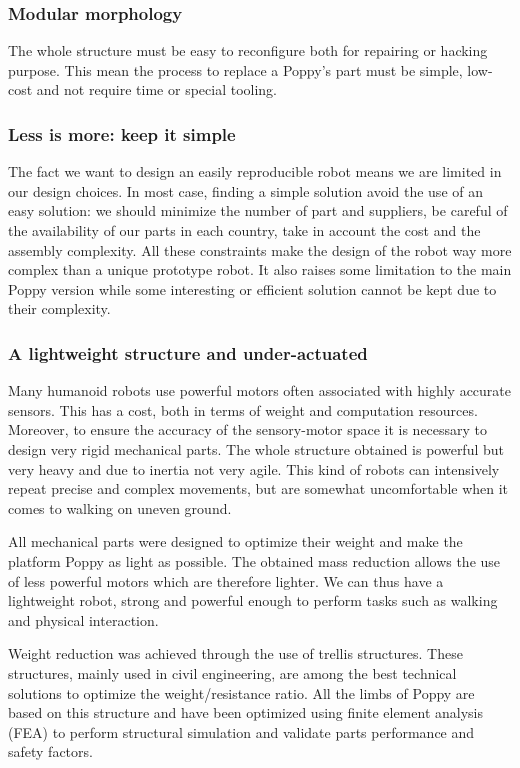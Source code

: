 \subsubsection{Modular morphology} %
The whole structure must be easy to reconfigure both for repairing or hacking purpose.
This mean the process to replace a Poppy's part must be simple, low-cost and not require time or special tooling.


\subsubsection{Less is more: keep it simple}

The fact we want to design an easily reproducible robot means we are limited in our design choices.
In most case, finding a simple solution avoid the use of an easy solution: we should minimize the number of part and suppliers, be careful of the availability of our parts in each country, take in account the cost and the assembly complexity.
All these constraints make the design of the robot way more complex than a unique prototype robot.
It also raises some limitation to the main Poppy version while some interesting or efficient solution cannot be kept due to their complexity.


\subsubsection{A lightweight structure and under-actuated} %

Many humanoid robots use powerful motors often associated with highly accurate sensors.
This has a cost, both in terms of weight and computation resources.
Moreover, to ensure the accuracy of the sensory-motor space it is necessary to design very rigid mechanical parts.
The whole structure obtained is powerful but very heavy and due to inertia not very agile.
This kind of robots can intensively repeat precise and complex movements, but are somewhat uncomfortable when it comes to walking on uneven ground.

All mechanical parts were designed to optimize their weight and make the platform Poppy as light as possible.
The obtained mass reduction allows the use of less powerful motors which are therefore lighter.
We can thus have a lightweight robot, strong and powerful enough to perform tasks such as walking and physical interaction.

Weight reduction was achieved through the use of trellis structures.
These structures, mainly used in civil engineering, are among the best technical solutions to optimize the weight/resistance ratio.
All the limbs of Poppy are based on this structure and have been optimized using finite element analysis (FEA) to perform structural simulation and validate parts performance and safety factors.


